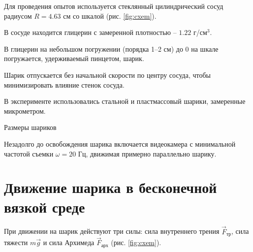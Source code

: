 \documentclass[a4paper,12pt]{article}
\begin{document}
Для проведения опытов используется стеклянный цилиндрический сосуд радиусом $R=4.63$ см со шкалой (рис. \ref{fig:cxem}).

В сосуде находится глицерин с замеренной плотностью -- $1.22$ г/см$^3$.  

В глицерин на небольшом погружении (порядка 1--2 см) до 0 на шкале погружается, удерживаемый пинцетом, шарик. 

Шарик отпускается без начальной скорости по центру сосуда, чтобы минимизировать влияние стенок сосуда.

В эксперименте использовались стальной и пластмассовый шарики, замеренные микрометром.

\begin{table}[H]
	\caption{Размеры шариков}
	\label{tab:sphere}
	\centering
	\pgfplotstabletypeset{\loadedtable}
\end{table}


Незадолго до освобождения шарика включается видеокамера с минимальной частотой съемки $\omega=20$ Гц, движимая примерно параллельно шарику.



\section{Движение шарика в бесконечной вязкой среде} %
\label{sec:eq}


При движении на шарик действуют три силы: сила внутреннего трения $\vec{F}_\text{тр}$, сила тяжести $m\vec{g}$ и сила  Архимеда $\vec{F}_\text{арх}$ (рис. \ref{fig:cxem}).
\end{document}
